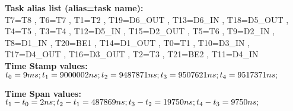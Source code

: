 \documentclass[landscape,a4paper,10pt]{article}
\begin{document}
\textbf{Task alias list (alias=task name):}\\
T7=T8 , 
T6=T7 , 
T1=T2 , 
T19=D6_OUT , 
T13=D6_IN , 
T18=D5_OUT , 
T4=T5 , 
T3=T4 , 
T12=D5_IN , 
T15=D2_OUT , 
T5=T6 , 
T9=D2_IN , 
T8=D1_IN , 
T20=BE1 , 
T14=D1_OUT , 
T0=T1 , 
T10=D3_IN , 
T17=D4_OUT , 
T16=D3_OUT , 
T2=T3 , 
T21=BE2 , 
T11=D4_IN\\

\textbf{Time Stamp values:}\\
$t_{0} = 9 ms; t_{1} = 9000002 ns; t_{2} = 9487871 ns; t_{3} = 9507621 ns; t_{4} = 9517371 ns;  \\
$

\textbf{Time Span values:}\\
$t_{1} - t_{0} = 2 ns; t_{2} - t_{1} = 487869 ns; t_{3} - t_{2} = 19750 ns; t_{4} - t_{3} = 9750 ns;  \\
$
\end{document}
